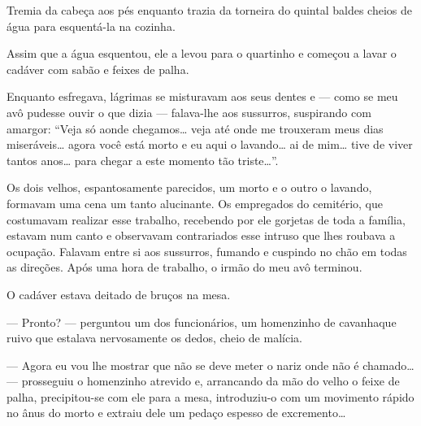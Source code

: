 Tremia da cabeça aos pés enquanto trazia da torneira do quintal baldes cheios
de água para esquentá-la na cozinha.

Assim que a água esquentou, ele a levou para o quartinho e começou a lavar o
cadáver com sabão e feixes de palha.

Enquanto esfregava, lágrimas se misturavam aos seus dentes e --- como se meu
avô pudesse ouvir o que dizia --- falava-lhe aos sussurros, suspirando com
amargor: ``Veja só aonde chegamos\ldots{} veja até onde me trouxeram meus
dias miseráveis\ldots{} agora você está morto e eu aqui o lavando\ldots{} ai
de mim\ldots{} tive de viver tantos anos\ldots{} para chegar a este momento
tão triste\ldots{}''.


Os dois velhos, espantosamente parecidos, um morto e o outro o lavando,
formavam uma cena um tanto alucinante. Os empregados do cemitério, que
costumavam realizar esse trabalho, recebendo por ele gorjetas de toda a
família, estavam num canto e observavam contrariados esse intruso que lhes
roubava a ocupação. Falavam entre si aos sussurros, fumando e cuspindo no
chão em todas as direções. Após uma hora de trabalho, o irmão do meu avô
terminou.

O cadáver estava deitado de bruços na mesa.

--- Pronto? --- perguntou um dos funcionários, um homenzinho de cavanhaque
    ruivo que estalava nervosamente os dedos, cheio de malícia.




--- Agora eu vou lhe mostrar que não se deve meter o nariz onde não é
    chamado\ldots{} --- prosseguiu o homenzinho atrevido e, arrancando da mão
    do velho o feixe de palha, precipitou-se com ele para a mesa,
    introduziu-o com um movimento rápido no ânus do morto e extraiu dele um
    pedaço espesso de excremento\ldots{}

